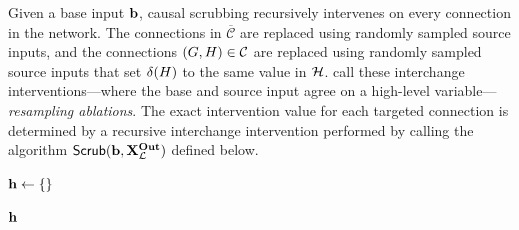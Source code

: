 \documentclass[twoside,11pt]{article}
\begin{document}
Given a base input $\mathbf{b}$, causal scrubbing recursively intervenes on every connection in the network. The connections in $\overline{\mathcal{C}}$ are replaced using randomly sampled source inputs, and the connections $(G, H) \in \mathcal{C}$ are replaced using randomly sampled source inputs that set $\delta(H)$ to the same value in $\mathcal{H}$. \cite{chan2022causal} call these interchange interventions---where the base and source input agree on a high-level variable---\textit{resampling ablations}. The exact intervention value for each targeted connection is determined by a recursive interchange intervention performed by calling the algorithm $\mathsf{Scrub}(\mathbf{b},\mathbf{X}^{\mathbf{Out}}_{\mathcal{L}})$ defined below.

    \begin{algorithm}[H]
    \small
    \caption{$\mathsf{Scrub}(\base, \hiddenneurons)$}
    $\mathbf{h} \leftarrow \{\}$
    
    \Return $\mathbf{h}$
    \end{algorithm}
    
\end{document}
